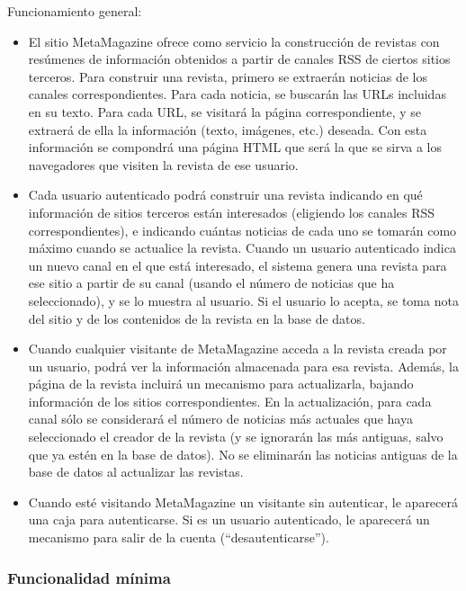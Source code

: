 Funcionamiento general:

\begin{itemize}
\item El sitio MetaMagazine ofrece como servicio la construcción de revistas con resúmenes de información obtenidos a partir de canales RSS de ciertos sitios terceros. Para construir una revista, primero se extraerán noticias de los canales correspondientes. Para cada noticia, se buscarán las URLs incluidas en su texto. Para cada URL, se visitará la página correspondiente, y se extraerá de ella la información (texto, imágenes, etc.) deseada. Con esta información se compondrá una página HTML que será la que se sirva a los navegadores que visiten la revista de ese usuario.

\item Cada usuario autenticado podrá construir una revista indicando en qué información de sitios terceros están interesados (eligiendo los canales RSS correspondientes), e indicando cuántas noticias de cada uno se tomarán como máximo cuando se actualice la revista. Cuando un usuario autenticado indica un nuevo canal en el que está interesado, el sistema genera una revista para ese sitio a partir de su canal (usando el número de noticias que ha seleccionado), y se lo muestra al usuario. Si el usuario lo acepta, se toma nota del sitio y de los contenidos de la revista en la base de datos.

\item Cuando cualquier visitante de MetaMagazine acceda a la revista creada por un usuario, podrá ver la información almacenada para esa revista. Además, la página de la revista incluirá un mecanismo para actualizarla, bajando información de los sitios correspondientes. En la actualización, para cada canal sólo se considerará el número de noticias más actuales que haya seleccionado el creador de la revista (y se ignorarán las más antiguas, salvo que ya estén en la base de datos). No se eliminarán las noticias antiguas de la base de datos al actualizar las revistas.

\item Cuando esté visitando MetaMagazine un visitante sin autenticar, le aparecerá una caja para autenticarse. Si es un usuario autenticado, le aparecerá un mecanismo para salir de la cuenta (``desautenticarse'').
\end{itemize}

\subsubsection{Funcionalidad mínima}

